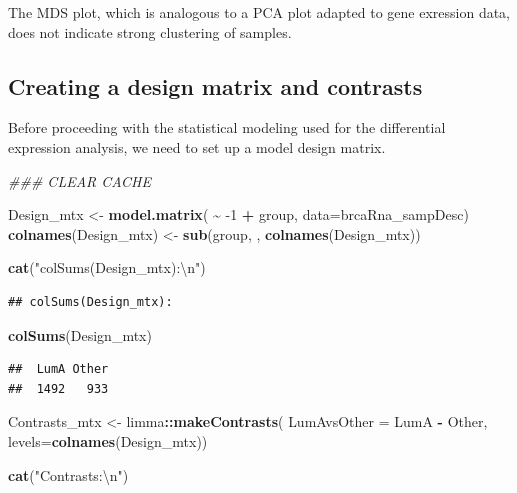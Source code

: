 \documentclass[
]{book}
\newenvironment{Shaded}{\begin{snugshade}}{\end{snugshade}}
\newcommand{\CharTok}[1]{\textcolor[rgb]{0.31,0.60,0.02}{#1}}
\newcommand{\CommentTok}[1]{\textcolor[rgb]{0.56,0.35,0.01}{\textit{#1}}}
\newcommand{\DataTypeTok}[1]{\textcolor[rgb]{0.13,0.29,0.53}{#1}}
\newcommand{\DecValTok}[1]{\textcolor[rgb]{0.00,0.00,0.81}{#1}}
\newcommand{\KeywordTok}[1]{\textcolor[rgb]{0.13,0.29,0.53}{\textbf{#1}}}
\newcommand{\NormalTok}[1]{#1}
\newcommand{\OperatorTok}[1]{\textcolor[rgb]{0.81,0.36,0.00}{\textbf{#1}}}
\newcommand{\StringTok}[1]{\textcolor[rgb]{0.31,0.60,0.02}{#1}}
\begin{document}
The MDS plot, which is analogous to a PCA plot adapted to gene exression data,
does not indicate strong clustering of samples.

\hypertarget{creating-a-design-matrix-and-contrasts-1}{%
\subsection*{Creating a design matrix and contrasts}\label{creating-a-design-matrix-and-contrasts-1}}

Before proceeding with the statistical modeling used for the
differential expression analysis, we need to set up a
model design matrix.

\begin{Shaded}
\begin{Highlighting}[]
\CommentTok{\#\#\# CLEAR CACHE}

\NormalTok{Design\_mtx <{-}}\StringTok{ }\KeywordTok{model.matrix}\NormalTok{( }\OperatorTok{\textasciitilde{}}\StringTok{  }\DecValTok{{-}1} \OperatorTok{+}\StringTok{ }\NormalTok{group, }\DataTypeTok{data=}\NormalTok{brcaRna\_sampDesc)}
\KeywordTok{colnames}\NormalTok{(Design\_mtx) <{-}}\StringTok{ }\KeywordTok{sub}\NormalTok{(}\StringTok{\textquotesingle{}group\textquotesingle{}}\NormalTok{, }\StringTok{\textquotesingle{}\textquotesingle{}}\NormalTok{, }\KeywordTok{colnames}\NormalTok{(Design\_mtx))}

\KeywordTok{cat}\NormalTok{(}\StringTok{"colSums(Design\_mtx):}\CharTok{\textbackslash{}n}\StringTok{"}\NormalTok{)}
\end{Highlighting}
\end{Shaded}

\begin{verbatim}
## colSums(Design_mtx):
\end{verbatim}

\begin{Shaded}
\begin{Highlighting}[]
\KeywordTok{colSums}\NormalTok{(Design\_mtx)}
\end{Highlighting}
\end{Shaded}

\begin{verbatim}
##  LumA Other 
##  1492   933
\end{verbatim}

\begin{Shaded}
\begin{Highlighting}[]
\NormalTok{Contrasts\_mtx <{-}}\StringTok{ }\NormalTok{limma}\OperatorTok{::}\KeywordTok{makeContrasts}\NormalTok{(}
  \DataTypeTok{LumAvsOther =}\NormalTok{ LumA  }\OperatorTok{{-}}\StringTok{ }\NormalTok{Other,}
  \DataTypeTok{levels=}\KeywordTok{colnames}\NormalTok{(Design\_mtx))}

\KeywordTok{cat}\NormalTok{(}\StringTok{"Contrasts:}\CharTok{\textbackslash{}n}\StringTok{"}\NormalTok{)}
\end{Highlighting}
\end{Shaded}
\end{document}
